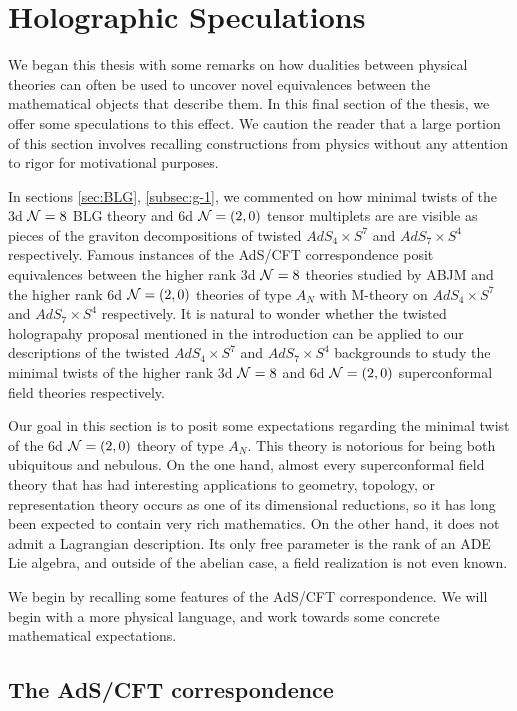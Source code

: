 \section{Holographic Speculations}\label{sec:holspec}
We began this thesis with some remarks on how dualities between physical theories can often be used to uncover novel equivalences between the mathematical objects that describe them. In this final section of the thesis, we offer some speculations to this effect.
We caution the reader that a large portion of this section involves recalling constructions from physics without any attention to rigor for motivational purposes.

In sections \ref{sec:BLG}, \ref{subsec:g-1}, we commented on how minimal twists of the 3d $\mathcal{N}=8$ BLG theory and 6d $\mathcal{N}=(2,0)$ tensor multiplets are are visible as pieces of the graviton decompositions of twisted $AdS_4\times S^7$ and $AdS_7\times S^4$ respectively. Famous instances of the AdS/CFT correspondence posit equivalences between the higher rank 3d $\mathcal{N}=8$ theories studied by ABJM and the higher rank 6d $\mathcal{N}=(2,0)$ theories of type $A_N$ with M-theory on $AdS_4\times S^7$ and $AdS_7\times S^4$ respectively. It is natural to wonder whether the twisted holograpahy proposal mentioned in the introduction can be applied to our descriptions of the twisted $AdS_4\times S^7$ and $AdS_7\times S^4$ backgrounds to study the minimal twists of the higher rank 3d $\mathcal{N}=8$ and 6d $\mathcal{N}=(2,0)$ superconformal field theories respectively.

Our goal in this section is to posit some expectations regarding the minimal twist of the 6d $\mathcal{N}=(2,0)$ theory of type $A_N$. This theory is notorious for being both ubiquitous and nebulous. On the one hand, almost every superconformal field theory that has had interesting applications to geometry, topology, or representation theory occurs as one of its dimensional reductions, so it has long been expected to contain very rich mathematics. On the other hand, it does not admit a Lagrangian description. Its only free parameter is the rank of an ADE Lie algebra, and outside of the abelian case, a field realization is not even known.

We begin by recalling some features of the AdS/CFT correspondence. We will begin with a more physical language, and work towards some concrete mathematical expectations. 

\subsection{The AdS/CFT correspondence}

